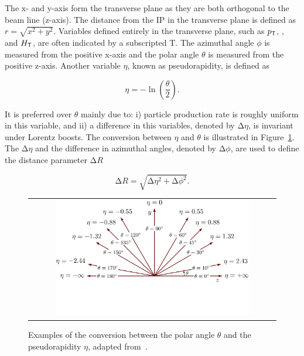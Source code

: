 The x- and y-axis form the transverse plane as they are both orthogonal to the beam line (z-axis). The distance from the \ac{IP} in the transverse plane is defined as $r=\sqrt{x^2+y^2}$. Variables defined entirely in the transverse plane, such as $p_{\textsf{T}}$, \MET, and $H_{\textsf{T}}$, are often indicated by a subscripted T. The azimuthal angle $\phi$ is measured from the positive x-axis and the polar angle $\theta$ is measured from the positive z-axis. Another variable $\eta$, known as pseudorapidity, is defined as

\begin{equation}
\eta=-\ln(\frac{\theta}{2}).
\end{equation}

It is preferred over $\theta$ mainly due to: i) particle production rate is roughly uniform in this variable, and ii) a difference in this variables, denoted by $\mathrm{\Delta}\eta$, is invariant under Lorentz boosts. The conversion between $\eta$ and $\theta$ is illustrated in Figure~\ref{fig:axis2D}. The $\mathrm{\Delta}\eta$ and the difference in azimuthal angles, denoted by $\mathrm{\Delta}\phi$, are used to define the distance parameter $\mathrm{\Delta}R$

\begin{equation}
\label{eq:DR}
\mathrm{\Delta}R=\sqrt{\mathrm{\Delta}\eta^2+\mathrm{\Delta}\phi^2}.
\end{equation}

\begin{figure}[tbh!]
 \begin{center}
 \begin{tabular}{c}
 \includegraphics[width=0.8\textwidth]{figures/Part2/CMS/axis2D_pseudorapidity-003}
 \end{tabular}
 \caption{Examples of the conversion between the polar angle $\theta$ and the pseudorapidity $\eta$, adapted from~\cite{tikz:2D}.}
 \label{fig:axis2D}
 \end{center}
\end{figure}


